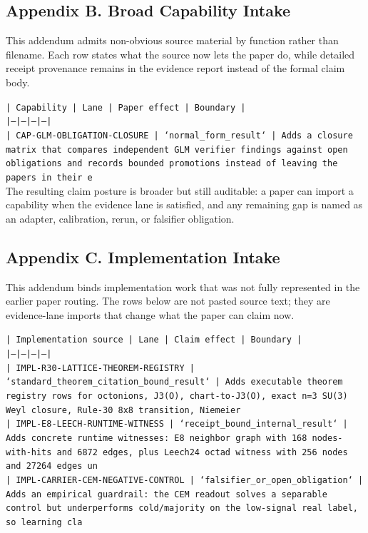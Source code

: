 \documentclass[11pt]{article}
\begin{document}
\subsection*{Appendix B. Broad Capability Intake}

This addendum admits non-obvious source material by function rather than filename. Each row states what the source now lets the paper do, while detailed receipt provenance remains in the evidence report instead of the formal claim body.

\noindent\texttt{| Capability | Lane | Paper effect | Boundary |}\\
\noindent\texttt{|---|---|---|---|}\\
\noindent\texttt{| CAP-GLM-OBLIGATION-CLOSURE | `normal\_form\_result` | Adds a closure matrix that compares independent GLM verifier findings against open obligations and records bounded promotions instead of leaving the papers in their e}\\

The resulting claim posture is broader but still auditable: a paper can import a capability when the evidence lane is satisfied, and any remaining gap is named as an adapter, calibration, rerun, or falsifier obligation.

\subsection*{Appendix C. Implementation Intake}

This addendum binds implementation work that was not fully represented in the earlier paper routing. The rows below are not pasted source text; they are evidence-lane imports that change what the paper can claim now.

\noindent\texttt{| Implementation source | Lane | Claim effect | Boundary |}\\
\noindent\texttt{|---|---|---|---|}\\
\noindent\texttt{| IMPL-R30-LATTICE-THEOREM-REGISTRY | `standard\_theorem\_citation\_bound\_result` | Adds executable theorem registry rows for octonions, J3(O), chart-to-J3(O), exact n=3 SU(3) Weyl closure, Rule-30 8x8 transition, Niemeier }\\
\noindent\texttt{| IMPL-E8-LEECH-RUNTIME-WITNESS | `receipt\_bound\_internal\_result` | Adds concrete runtime witnesses: E8 neighbor graph with 168 nodes-with-hits and 6872 edges, plus Leech24 octad witness with 256 nodes and 27264 edges un}\\
\noindent\texttt{| IMPL-CARRIER-CEM-NEGATIVE-CONTROL | `falsifier\_or\_open\_obligation` | Adds an empirical guardrail: the CEM readout solves a separable control but underperforms cold/majority on the low-signal real label, so learning cla}\\
\end{document}
